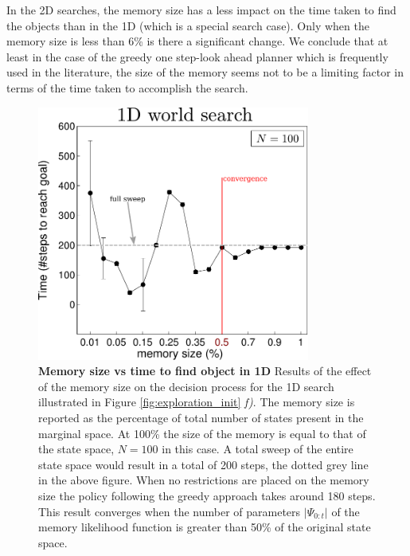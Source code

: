 In the 2D searches, the memory size has a less impact on the time taken to find the objects than in the 1D (which is a special search case). 
Only when the memory size is less than 6\% is there a significant change. We conclude that at least in the case of 
the greedy one step-look ahead planner which is frequently used in the literature, the size of the memory seems not to be a limiting factor in terms of the time taken to accomplish the search.

\begin{figure}	
  \centering
  \includegraphics[width=0.8\textwidth]{./ch5-MLMF/Figures/exper_mem_1d.pdf}
  \caption{\textbf{Memory size vs time to find object in 1D} Results of the effect of the memory size on the decision process
  for the 1D search illustrated in Figure \ref{fig:exploration_init} \textit{f)}.
  The memory size is reported as the percentage of total number of states present in the marginal space. At 100\% the size
  of the memory is equal to that of the state space, $N=100$ in this case. A total sweep of the entire state space would result in a total of 
  200 steps, the dotted grey line in the above figure. When no restrictions are placed on the memory size the policy following the greedy 
  approach takes around 180 steps. This result converges when the number of parameters $|\Psi_{0:t}|$ of the memory likelihood function is 
  greater than 50\% of the original state space. } 
  \label{fig:time_to_reach_goal_1D}
\end{figure}

